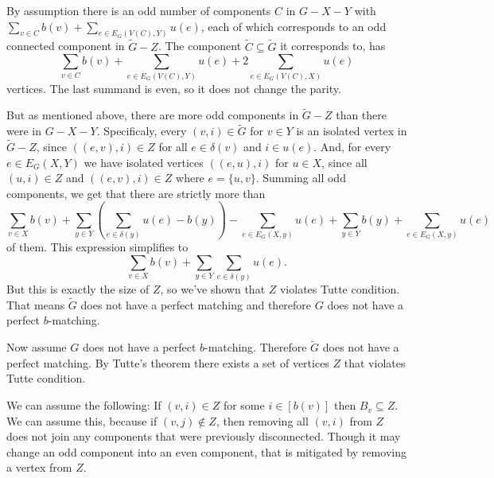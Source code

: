 \begin{exercise}{3}
    By assumption there is an odd number of components $C$ in $G - X - Y$ with
    $\sum_{v \in C} b(v) + \sum_{e \in E_G(V(C), Y)} u(e)$, each of which
    corresponds to an odd connected component in $\tilde{G} - Z$. The component
    $\tilde{C} \subseteq \tilde{G}$ it corresponds to, has
    \begin{equation*}
        \sum_{v \in C} b(v) + \sum_{e \in E_G(V(C), Y)} u(e) + 2 \sum_{e \in
        E_G(V(C), X)} u(e)
    \end{equation*}
    vertices. The last summand is even, so it does not change the parity.

    But as mentioned above, there are more odd components in $\tilde{G} - Z$
    than there were in $G - X - Y$. Specificaly, every $(v, i) \in \tilde{G}$
    for $v \in Y$ is an isolated vertex in $\tilde{G} - Z$, since $((e, v), i)
    \in Z$ for all $e \in \delta(v)$ and $i \in u(e)$. And, for every $e \in
    E_G(X, Y)$ we have isolated vertices $((e, u), i)$ for $u \in X$, since all
    $(u, i) \in Z$ and $((e, v), i) \in Z$ where $e = \{u, v\}$. Summing all odd
    components, we get that there are strictly more than
    \begin{equation*}
        \sum_{v \in X} b(v) + \sum_{y \in Y} \left( \sum_{e \in \delta(y)} u(e)
        - b(y) \right) - \sum_{e \in E_G(X, y)} u(e) + \sum_{y \in Y} b(y) +
        \sum_{e \in E_G(X, y)} u(e)
    \end{equation*}
    of them. This expression simplifies to 
    \begin{equation*}
        \sum_{v \in X} b(v) + \sum_{y \in Y} \sum_{e \in \delta(y)} u(e).
    \end{equation*}
    But this is exactly the size of $Z$, so we've shown that $Z$ violates Tutte
    condition. That means $\tilde{G}$ does not have a perfect matching and
    therefore $G$ does not have a perfect $b$-matching.

    Now assume $G$ does not have a perfect $b$-matching. Therefore $\tilde{G}$
    does not have a perfect matching. By Tutte's theorem there exists a set of
    vertices $Z$ that violates Tutte condition.


    We can assume the following:
    If $(v, i) \in Z$ for some $i \in [b(v)]$ then $B_v \subseteq Z$. We can
    assume this, because if $(v, j) \notin Z$, then removing all $(v, i)$ from
    $Z$ does not join any components that were previously disconnected. Though
    it may change an odd component into an even component, that is mitigated by
    removing a vertex from $Z$.


\end{exercise}
